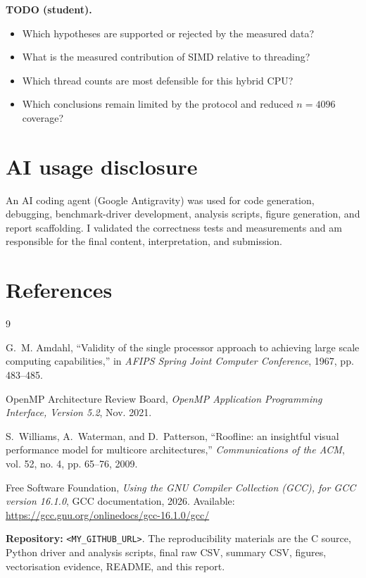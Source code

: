 \documentclass[a4paper,11pt]{article}
\begin{document}
\textbf{TODO (student).}
\begin{itemize}
  \item Which hypotheses are supported or rejected by the measured data?
  \item What is the measured contribution of SIMD relative to threading?
  \item Which thread counts are most defensible for this hybrid CPU?
  \item Which conclusions remain limited by the protocol and reduced
  $n=4096$ coverage?
\end{itemize}

\section{AI usage disclosure}

An AI coding agent (Google Antigravity) was used for code generation,
debugging, benchmark-driver development, analysis scripts, figure generation,
and report scaffolding. I validated the correctness tests and measurements
and am responsible for the final content, interpretation, and submission.

\section{References}

\begin{thebibliography}{9}

G.~M. Amdahl, ``Validity of the single processor approach to achieving large
scale computing capabilities,'' in \emph{AFIPS Spring Joint Computer
Conference}, 1967, pp. 483--485.

OpenMP Architecture Review Board, \emph{OpenMP Application Programming
Interface, Version 5.2}, Nov. 2021.

S.~Williams, A.~Waterman, and D.~Patterson, ``Roofline: an insightful visual
performance model for multicore architectures,'' \emph{Communications of the
ACM}, vol. 52, no. 4, pp. 65--76, 2009.

Free Software Foundation, \emph{Using the GNU Compiler Collection (GCC), for
GCC version 16.1.0}, GCC documentation, 2026. Available:
\url{https://gcc.gnu.org/onlinedocs/gcc-16.1.0/gcc/}

\end{thebibliography}

\noindent\textbf{Repository:} \texttt{<MY\_GITHUB\_URL>}. The reproducibility
materials are the C source, Python driver and analysis scripts, final raw CSV,
summary CSV, figures, vectorisation evidence, README, and this report.
\end{document}
